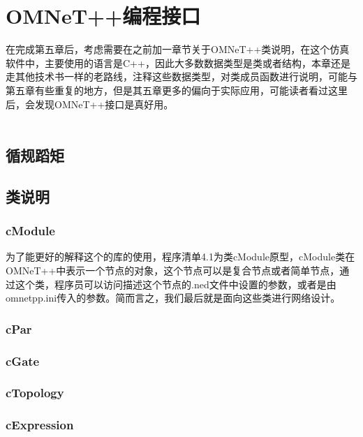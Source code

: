 \chapter{OMNeT++编程接口}

\begin{summary}
在完成第五章后，考虑需要在之前加一章节关于OMNeT++类说明，在这个仿真软件中，主要使用的语言是C++，因此大多数数据类型是类或者结构，本章还是走其他技术书一样的老路线，注释这些数据类型，对类成员函数进行说明，可能与第五章有些重复的地方，但是其五章更多的偏向于实际应用，可能读者看过这里后，会发现OMNeT++接口是真好用。\\ \\
\end{summary}

\section{循规蹈矩}


\section{类说明}



\subsection{cModule}
为了能更好的解释这个的库的使用，程序清单4.1为类cModule原型，cModule类在OMNeT++中表示一个节点的对象，这个节点可以是复合节点或者简单节点，通过这个类，程序员可以访问描述这个节点的.ned文件中设置的参数，或者是由omnetpp.ini传入的参数。简而言之，我们最后就是面向这些类进行网络设计。\\


\subsection{cPar}


\subsection{cGate}


\subsection{cTopology}


\subsection{cExpression}



